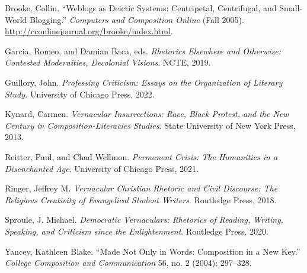 \documentclass{tufte-handout}
\begin{document}
\begin{hangparas}{.25in}{1} 



Brooke, Collin. ``Weblogs as Deictic Systems: Centripetal, Centrifugal,
and Small-World Blogging.'' \emph{Computers and Composition Online}
(Fall 2005). \url{http://cconlinejournal.org/brooke/index.html}.

Garcia, Romeo, and Damian Baca, eds. \emph{Rhetorics Elsewhere and
Otherwise: Contested Modernities, Decolonial Visions}. NCTE, 2019.

Guillory, John. \emph{Professing Criticism: Essays on the Organization
of Literary Study.} University of Chicago Press, 2022.

Kynard, Carmen. \emph{Vernacular Insurrections: Race, Black Protest, and
the New Century in Composition-Literacies Studies}. State University of
New York Press, 2013.

Reitter, Paul, and Chad Wellmon. \emph{Permanent Crisis: The Humanities
in a Disenchanted Age}. University of Chicago Press, 2021.

Ringer, Jeffrey M. \emph{Vernacular Christian Rhetoric and Civil
Discourse: The Religious Creativity of Evangelical Student Writers}.
Routledge Press, 2018.

Sproule, J. Michael. \emph{Democratic Vernaculars: Rhetorics of Reading,
Writing, Speaking, and Criticism since the Enlightenment}. Routledge
Press, 2020.

Yancey, Kathleen Blake. ``Made Not Only in Words: Composition in a New
Key.'' \emph{College Composition and Communication} 56, no. 2 (2004):
297--328.



\end{hangparas}
\end{document}
